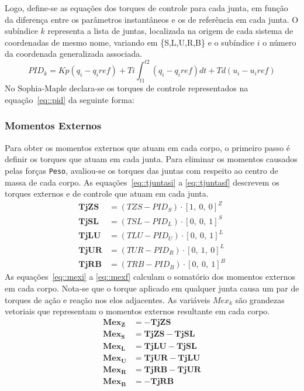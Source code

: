 Logo, define-se as equações dos torques de controle para cada junta, em função
da diferença entre os parâmetros instantâneos e os de referência em cada junta.
O subíndice $k$ representa a lista de juntas, localizada na origem de cada
sistema de coordenadas de mesmo nome, variando em \{S,L,U,R,B\} e o
subíndice $i$ o número da coordenada generalizada associada.
%
\begin{equation}
	PID_{k} = Kp(q_i-q_i{ref}) + Ti\int_{t1}^{t2} (q_i-q_i{ref})dt +
	Td(u_i-u_i{ref}) \label{eq::pid}
\end{equation}
%
No Sophia-Maple declara-se os torques de controle representados na
equação~\ref{eq::pid} da seguinte forma:

\bigskip {}

\subsubsection{Momentos Externos}

Para obter os momentos externos que atuam em cada corpo, o primeiro passo é
definir os torques que atuam em cada junta. Para eliminar os momentos causados
pelas forças \texttt{Peso}, avaliou-se os torques das juntas com respeito ao
centro de massa de cada corpo. As equações~\ref{eq::tjuntasi} a
\ref{eq::tjuntasf} descrevem os torques externos e de controle que atuam em cada
junta.
\begin{align}
	\mathbf{TjZS} &= (TZS - PID_{S})\cdot[1,~0,~0]^Z \label{eq::tjuntasi} \\
	\mathbf{TjSL} &= (TSL - PID_{L})\cdot[0,~0,~1]^S \\
	\mathbf{TjLU} &= (TLU - PID_{U})\cdot[0,~0,~1]^L \\
	\mathbf{TjUR} &= (TUR - PID_{R})\cdot[0,~1,~0]^L \\
	\mathbf{TjRB} &= (TRB - PID_{B})\cdot[0,~0,~1]^B \label{eq::tjuntasf}
\end{align}
%
As equações~\ref{eq::mexi} a \ref{eq::mexf} calculam o somatório dos momentos
externos em cada corpo. Nota-se que o torque aplicado em qualquer junta causa
um par de torques de ação e reação nos elos adjacentes. As variáveis $Mex_k$ são
grandezas vetoriais que representam o momentos externos resultante em cada
corpo.
%
\begin{align}
	\mathbf{Mex_{Z}} &= - \mathbf{TjZS } \label{eq::mexi}\\
	\mathbf{Mex_{S}} &= \mathbf{TjZS} - \mathbf{TjSL }\\
	\mathbf{Mex_{L}} &= \mathbf{TjLU }- \mathbf{TjSL }\\
	\mathbf{Mex_{U}} &= \mathbf{TjUR }- \mathbf{TjLU }\\
	\mathbf{Mex_{R}} &= \mathbf{TjRB }- \mathbf{TjUR }\\
	\mathbf{Mex_{B}} &= - \mathbf{TjRB} \label{eq::mexf}
\end{align}
%

